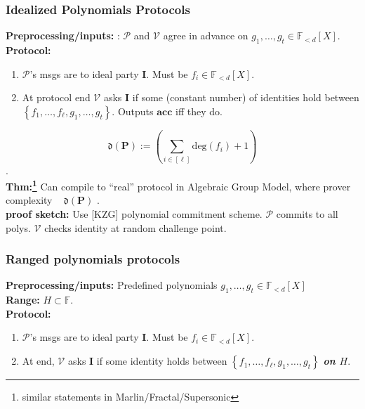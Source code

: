 \documentclass[shadesubsections,compress,14pt,mathserif]{beamer}
\newcommand{\prot}{\mathbf{P}}
\newcommand{\aggdeg}[1]{\mathfrak{d}(#1)}
\renewcommand{\deg}{\mathrm{deg}}
\newcommand{\F}{\ensuremath{\mathbb F}}
\newcommand{\set}[1]{\ensuremath{\left\{#1\right\}}}
\newcommand{\defeq}{\ensuremath{:=}}
\newcommand{\ver}{\ensuremath{\mathcal{V}}}
\newcommand{\prv}{\ensuremath{\mathcal{P}}}
\newcommand{\polysofdeg}[1]{\F_{< #1}[X]}
\newcommand{\acc}{{\mathbf{acc}}}
\newcommand{\ideal}{\mathbf{I}}
\begin{document}
\begin{frame}
\frametitle{Idealized Polynomials Protocols}   %
 
 \textbf{Preprocessing/inputs:} : $\prv$ and $\ver$ agree in advance on $g_1,\ldots,g_t\in \polysofdeg{d}$.\\
 \vspace{0.4in}
\textbf{Protocol:}
  \begin{enumerate}

\item 
$\prv$'s  msgs are to ideal party $\ideal$. Must be $f_i\in \polysofdeg{d}$.
 \item At protocol end $\ver$ asks $\ideal$ if some (constant number) of identities hold between $\set{f_1,\ldots,f_\ell,g_1,\ldots,g_t}$.  Outputs $\acc$ iff they do.
\end{enumerate}
\end{frame}
\begin{frame}


$$\aggdeg{\prot}\defeq\left(\sum_{i\in [\ell]} \deg(f_i)+1\right)$$.\pause \\
 \vspace{0.2in}
\textbf{Thm:\footnote{similar statements in Marlin/Fractal/Supersonic}}
Can compile to ``real'' protocol in Algebraic Group Model, where prover complexity ~ $\aggdeg{\prot}$ .\\ \pause
 \vspace{0.2in}
\textbf{proof sketch:}
 Use [KZG] polynomial commitment scheme. $\prv$ commits to all polys. $\ver$ checks identity at random challenge point. 
\end{frame}
\begin{frame}
\frametitle{Ranged polynomials protocols}   %

\textbf{Preprocessing/inputs:} Predefined polynomials $g_1,\ldots,g_t\in \polysofdeg{d}$\\
\textbf{Range:} $H\subset\F$.\\ \pause
\vspace{0.4in}
\textbf{Protocol:}
 
 \begin{enumerate}
\item $\prv$'s  msgs are to ideal party $\ideal$. Must be $f_i\in \polysofdeg{d}$.
\item At end, $\ver$ asks $\ideal$ if some identity holds between $\set{f_1,\ldots,f_\ell,g_1,\ldots,g_t}$   \textbf{\textit{on $H$}}. 

\end{enumerate}
\end{frame}
\end{document}
